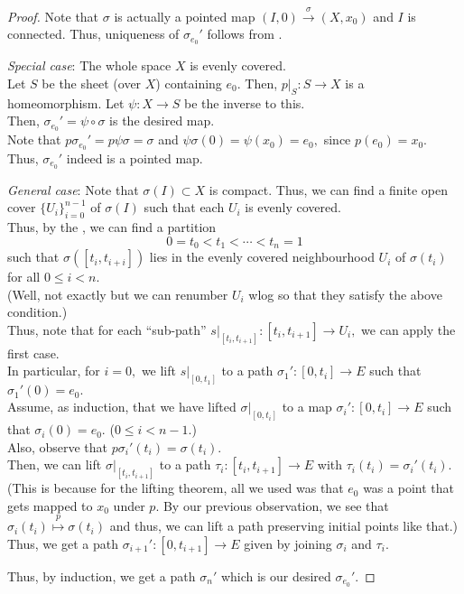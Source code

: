 \documentclass[12pt]{article}
\begin{document}
\begin{proof} 
	Note that $\sigma$ is actually a pointed map $(I, 0) \overset{\sigma}{\longrightarrow} (X, x_0)$ and $I$ is connected. Thus, uniqueness of $\sigma_{e_0}'$ follows from .

	\emph{Special case}: The whole space $X$ is evenly covered. \\
	Let $S$ be the sheet (over $X$) containing $e_0.$ Then, $p|_S : S \to X$ is a homeomorphism. Let $\psi:X \to S$ be the inverse to this.\\
	Then, $\sigma_{e_0}' = \psi\circ\sigma$ is the desired map.\\
	Note that $p\sigma_{e_0}' = p\psi\sigma = \sigma$ and $\psi\sigma(0) = \psi(x_0) = e_0,$ since $p(e_0) = x_0.$ Thus, $\sigma_{e_0}'$ indeed is a pointed map.

	\emph{General case}: Note that $\sigma(I) \subset X$ is compact. Thus, we can find a finite open cover $\{U_i\}_{i = 0}^{n-1}$ of $\sigma(I)$ such that each $U_i$ is evenly covered.\\
	Thus, by the , we can find a partition
	\begin{equation*} 
		0 = t_0 < t_1 < \cdots < t_n = 1
	\end{equation*}
	such that $\sigma([t_i, t_{i + i}])$ lies in the evenly covered neighbourhood $U_i$ of $\sigma(t_i)$ for all $0 \le i < n.$\\
	(Well, not exactly but we can renumber $U_i$ wlog so that they satisfy the above condition.)\\
	Thus, note that for each ``sub-path'' $s|_{[t_i, t_{i + 1}]} : [t_i, t_{i + 1}] \to U_i,$ we can apply the first case.\\
	In particular, for $i = 0,$ we lift $s|_{[0, t_1]}$ to a path $\sigma_1':[0, t_i] \to E$ such that $\sigma_1'(0) = e_0.$\\
	Assume, as induction, that we have lifted $\sigma|_{[0, t_i]}$ to a map $\sigma_i':[0, t_i] \to E$ such that $\sigma_i(0) = e_0.$ ($0 \le i < n - 1.$)\\
	Also, observe that $p\sigma_i'(t_i) = \sigma(t_i).$\\
	Then, we can lift $\sigma|_{[t_i, t_{i + 1}]}$ to a path $\tau_i:[t_i, t_{i + 1}] \to E$ with $\tau_i(t_i) = \sigma_i'(t_{i}).$ (This is because for the lifting theorem, all we used was that $e_0$ was a point that gets mapped to $x_0$ under $p$. By our previous observation, we see that $\sigma_i(t_i) \overset{p}{\mapsto}\sigma(t_i)$ and thus, we can lift a path preserving initial points like that.)\\
	Thus, we get a path $\sigma_{i+1}':[0, t_{i + 1}] \to E$ given by joining $\sigma_i$ and $\tau_i.$

	Thus, by induction, we get a path $\sigma_n'$ which is our desired $\sigma_{e_0}'.$	
\end{proof}
\end{document}
